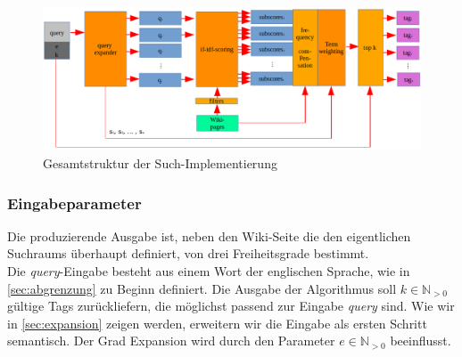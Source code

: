 \documentclass[12pt,pdftex,a4paper]{article}
\begin{document}
\begin{figure}[h]
	\centering
	\includegraphics[width=1.0\linewidth]{Bilder/impl_structure}
	\caption[Schematische Darstellung]{Gesamtstruktur der Such-Implementierung}
	\label{fig:implstructure}
\end{figure}

\subsubsection{Eingabeparameter}
Die produzierende Ausgabe ist, neben den Wiki-Seite die den eigentlichen Suchraums überhaupt definiert, von drei Freiheitsgrade bestimmt. \\
Die \textit{query}-Eingabe besteht aus einem Wort der englischen Sprache, wie in  \autoref{sec:abgrenzung} zu Beginn definiert.
Die Ausgabe der Algorithmus soll $k \in \mathbb{N}_{>0}$ gültige Tags zurückliefern, die möglichst passend zur Eingabe \textit{query} sind. 
Wie wir in \autoref{sec:expansion} zeigen werden, erweitern wir die Eingabe als ersten Schritt semantisch. Der Grad Expansion wird durch den Parameter $e \in \mathbb{N}_{>0}$ beeinflusst.
\end{document}
